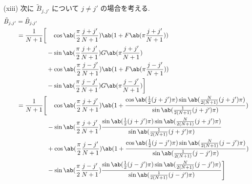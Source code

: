 \documentclass[uplatex,dvipdfmx,a4paper,11pt]{jlreq}
\numberwithin{equation}{section}
\theoremstyle{definition}
\begin{document}
(xiii) 次に $\tilde{B}_{j,j'}$ について $j \neq j'$ の場合を考える.
\begin{align}
  \tilde{B}_{j,j'} & = \tilde{B}_{j,j'}                                                                                                                                                                      \\
                   & \ \begin{aligned}
                         = \frac{1}{N+1}\bigg[ & \quad\cos\ab(\frac{\pi}{2}\frac{j + j'}{N+1})\ab(1 + F\ab(\pi\frac{j + j'}{N+1})) \\
                                               & - \sin\ab(\frac{\pi}{2}\frac{j + j'}{N+1})G\ab(\pi\frac{j + j'}{N+1})             \\
                                               & + \cos\ab(\frac{\pi}{2}\frac{j - j'}{N+1})\ab(1 + F\ab(\pi\frac{j - j'}{N+1}))    \\
                                               & - \sin\ab(\frac{\pi}{2}\frac{j - j'}{N+1})G\ab(\pi\frac{j - j'}{N+1})\bigg]
                       \end{aligned}                                                                                             \\
                   & \ \begin{aligned}
                         = \frac{1}{N+1}\Bigg[ & \quad\cos\ab(\frac{\pi}{2}\frac{j + j'}{N+1})\ab(1 + \frac{\cos\ab(\frac{1}{2}(j+j')\pi)\sin\ab(\frac{N}{2(N+1)}(j+j')\pi)}{\sin\ab(\frac{1}{2(N+1)}(j+j')\pi)}) \\
                                               & - \sin\ab(\frac{\pi}{2}\frac{j + j'}{N+1})\frac{\sin\ab(\frac{1}{2}(j+j')\pi)\sin\ab(\frac{N}{2(N+1)}(j+j')\pi)}{\sin\ab(\frac{1}{2(N+1)}(j+j')\pi)}             \\
                                               & + \cos\ab(\frac{\pi}{2}\frac{j - j'}{N+1})\ab(1 + \frac{\cos\ab(\frac{1}{2}(j-j')\pi)\sin\ab(\frac{N}{2(N+1)}(j-j')\pi)}{\sin\ab(\frac{1}{2(N+1)}(j-j')\pi)})    \\
                                               & - \sin\ab(\frac{\pi}{2}\frac{j - j'}{N+1})\frac{\sin\ab(\frac{1}{2}(j-j')\pi)\sin\ab(\frac{N}{2(N+1)}(j-j')\pi)}{\sin\ab(\frac{1}{2(N+1)}(j-j')\pi)}\Bigg]
                       \end{aligned}                                                                                              \\
                   & \ \begin{aligned}

\end{aligned}
\end{align}
\end{document}
